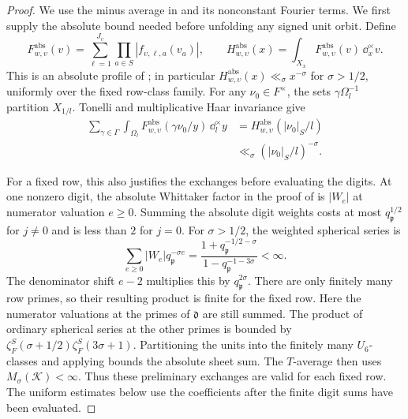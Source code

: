 \begin{proof}
We use the minus average in  and its
nonconstant Fourier terms.  We first supply the absolute bound needed
before unfolding any signed unit orbit.  Define
\[
 F^{\mathrm{abs}}_{w,\upsilon}(v)
    =\sum_{\ell=1}^{J_\upsilon}
           \prod_{a\in S}|f_{\upsilon,\ell,a}(v_a)|,\qquad
 H^{\mathrm{abs}}_{w,\upsilon}(x)
    =\int_{X_x}F^{\mathrm{abs}}_{w,\upsilon}(v)\,\dd_x^\times v.
\]
This is an absolute profile of ; in particular
\(H^{\mathrm{abs}}_{w,\upsilon}(x)\ll_\sigma x^{-\sigma}\) for
\(\sigma>1/2\), uniformly over the fixed row-class family.  For any
\(\nu_0\in F^\times\), the sets \(\gamma\Omega_l^{-1}\) partition
\(X_{1/l}\).  Tonelli and multiplicative Haar invariance give
\begin{equation}\label{eq:reflection-reflected-absolute}
\begin{split}
 \sum_{\gamma\in\Gamma}\int_{\Omega_l}
       F^{\mathrm{abs}}_{w,\upsilon}(\gamma\nu_0/y)\,\dd_l^\times y
  &=H^{\mathrm{abs}}_{w,\upsilon}(|\nu_0|_S/l)\\
  &\ll_\sigma(|\nu_0|_S/l)^{-\sigma}.
\end{split}
\end{equation}

For a fixed row, this also justifies the exchanges before evaluating the
digits.  At one nonzero digit, the absolute Whittaker factor in the proof of
 is \(|W_e|\) at numerator valuation
\(e\ge0\).  Summing the absolute digit weights costs at most
\(q_{\mathfrak p}^{1/2}\) for \(j\ne0\) and is less than \(2\) for \(j=0\).
For \(\sigma>1/2\), the weighted spherical series is
\[
 \sum_{e\ge0}|W_e|q_{\mathfrak p}^{-\sigma e}
   =\frac{1+q_{\mathfrak p}^{-1/2-\sigma}}
          {1-q_{\mathfrak p}^{-1-3\sigma}}<\infty.
\]
The denominator shift \(e-2\) multiplies this by
\(q_{\mathfrak p}^{2\sigma}\).  There are only finitely many row primes,
so their resulting product is finite for the fixed row.  Here the numerator
valuations at the primes of \(\mathfrak d\) are still summed.  The product
of ordinary spherical series at the other primes is bounded by
\(\zeta_F^S(\sigma+1/2)\zeta_F^S(3\sigma+1)\).  Partitioning the units
into the finitely many \(U_6\)-classes and applying
 bounds the absolute sheet sum.
The \(T\)-average then uses \(M_\sigma(\mathcal K)<\infty\).
Thus these preliminary exchanges are valid for each fixed row.  The
uniform estimates below use the coefficients after the finite digit sums
have been evaluated.


\end{proof}
